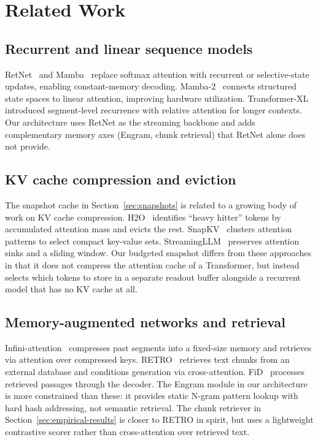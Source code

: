 \documentclass[preprint,12pt]{elsarticle}
\begin{document}
\section{Related Work}

\subsection{Recurrent and linear sequence models}

RetNet~\cite{retnet} and Mamba~\cite{mamba} replace softmax attention with recurrent or selective-state updates, enabling constant-memory decoding. Mamba-2~\cite{mamba2} connects structured state spaces to linear attention, improving hardware utilization. Transformer-XL~\cite{transformerxl} introduced segment-level recurrence with relative attention for longer contexts. Our architecture uses RetNet as the streaming backbone and adds complementary memory axes (Engram, chunk retrieval) that RetNet alone does not provide.

\subsection{KV cache compression and eviction}

The snapshot cache in Section~\ref{sec:snapshots} is related to a growing body of work on KV cache compression. H2O~\cite{h2o} identifies ``heavy hitter'' tokens by accumulated attention mass and evicts the rest. SnapKV~\cite{snapkv} clusters attention patterns to select compact key-value sets. StreamingLLM~\cite{streamingllm} preserves attention sinks and a sliding window. Our budgeted snapshot differs from these approaches in that it does not compress the attention cache of a Transformer, but instead selects which tokens to store in a separate readout buffer alongside a recurrent model that has no KV cache at all.

\subsection{Memory-augmented networks and retrieval}

Infini-attention~\cite{infiniattention} compresses past segments into a fixed-size memory and retrieves via attention over compressed keys. RETRO~\cite{retro} retrieves text chunks from an external database and conditions generation via cross-attention. FiD~\cite{fid} processes retrieved passages through the decoder. The Engram module in our architecture is more constrained than these: it provides static N-gram pattern lookup with hard hash addressing, not semantic retrieval. The chunk retriever in Section~\ref{sec:empirical-results} is closer to RETRO in spirit, but uses a lightweight contrastive scorer rather than cross-attention over retrieved text.
\end{document}
